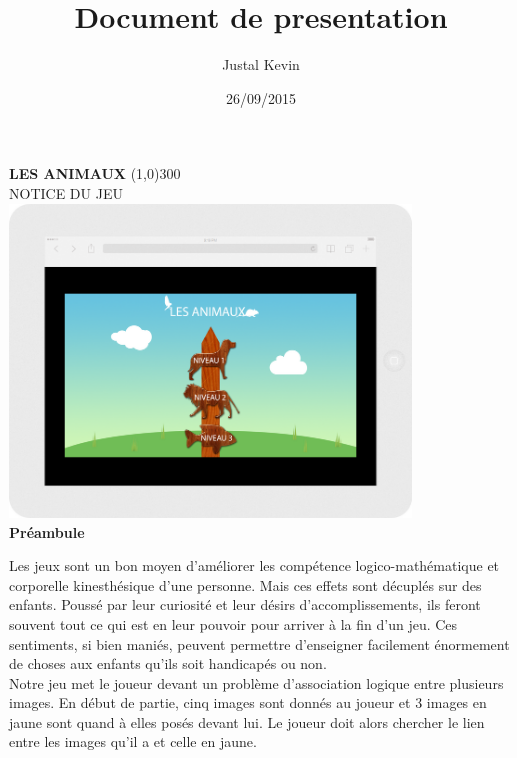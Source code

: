 \documentclass{article}
\title{Document de presentation}
\author{Justal Kevin}
\date{26/09/2015}
\begin{document}
\begin{center}
\textbf{\Huge{LES ANIMAUX}}
\line(1,0){300}\\
NOTICE DU JEU\\
\vspace{3cm}
\includegraphics[width=0.8\textwidth]{tablette}\\
\vspace{3cm}
\textbf{Pr\'eambule}
\end{center}

\hspace*{0.6cm}Les jeux sont un bon moyen d'am\'eliorer les compétence logico-mathématique et corporelle kinesthésique d'une personne. Mais ces effets sont décuplés sur des enfants. Poussé par leur curiosité et leur désirs d'accomplissements, ils feront souvent tout ce qui est en leur pouvoir pour arriver à la fin d'un jeu. Ces sentiments, si bien maniés, peuvent permettre d'enseigner facilement énormement de choses aux enfants qu'ils soit handicapés ou non.
\vspace{0.5cm}\\
\hspace*{0.6cm}Notre jeu met le joueur devant un problème d'association logique entre plusieurs images. En début de partie, cinq images sont donnés au joueur et 3 images en jaune sont quand à elles posés devant lui. Le joueur doit alors chercher le lien entre les images qu'il a et celle en jaune.

\newpage
\tableofcontents

\newpage
\end{document}
